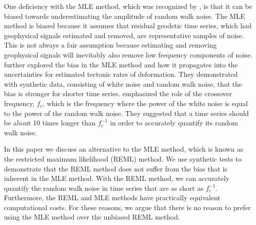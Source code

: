 \documentclass{svjour3}                     %
\begin{document}
One deficiency with the MLE method, which was recognized by \citet{Langbein1997}, is that it can be biased towards underestimating the amplitude of random walk noise. The MLE method is biased because it assumes that residual geodetic time series, which had geophysical signals estimated and removed, are representative samples of noise. This is not always a fair assumption because estimating and removing geophysical signals will inevitably also remove low frequency components of noise. \citet{Langbein2012} further explored the bias in the MLE method and how it propagates into the uncertainties for estimated tectonic rates of deformation. They demonstrated with synthetic data, consisting of white noise and random walk noise, that the bias is stronger for shorter time series. \citet{Langbein2012} emphasized the role of the crossover frequency, $f_c$, which is the frequency where the power of the white noise is equal to the power of the random walk noise. They suggested that a time series should be about 10 times longer than $f_c^{-1}$ in order to accurately quantify its random walk noise. 

In this paper we discuss an alternative to the MLE method, which is known as the restricted maximum likelihood (REML) method.  We use synthetic tests to demonstrate that the REML method does not suffer from the bias that is inherent in the MLE method. With the REML method, we can accurately quantify the random walk noise in time series that are as short as $f_c^{-1}$. Furthermore, the REML and MLE methods have practically equivalent computational costs. For these reasons, we argue that there is no reason to prefer using the MLE method over the unbiased REML method. 
\end{document}
